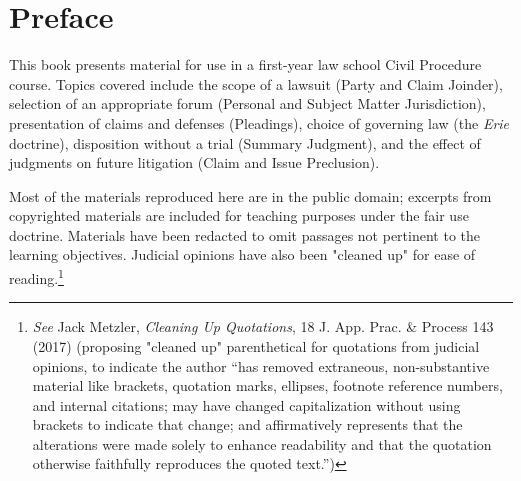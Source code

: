 \clearpage

\thispagestyle{empty}

\vspace*{\fill}
\vspace*{\fill}

\chapter*{Preface}

This book presents material for use in a first-year law school Civil Procedure course. Topics covered include the scope of a lawsuit (Party and Claim Joinder), selection of an appropriate forum (Personal and Subject Matter Jurisdiction), presentation of claims and defenses (Pleadings), choice of governing law (the {\textit{Erie}} doctrine), disposition without a trial (Summary Judgment), and the effect of judgments on future litigation (Claim and Issue Preclusion).

Most of the materials reproduced here are in the public domain; excerpts from copyrighted materials are included for teaching purposes under the fair use doctrine. Materials have been redacted to omit passages not pertinent to the learning objectives. Judicial opinions have also been "cleaned up" for ease of reading.\footnote{\textit{See} Jack Metzler, {\textit{Cleaning Up Quotations}}, 18 J. App. Prac. \& Process 143 (2017) (proposing "cleaned up" parenthetical for quotations from judicial opinions, to indicate the author “has removed extraneous, non-substantive material like brackets, quotation marks, ellipses, footnote reference numbers, and internal citations; may have changed capitalization without using brackets to indicate that change; and affirmatively represents that the alterations were made solely to enhance readability and that the quotation otherwise faithfully reproduces the quoted text.”)} 